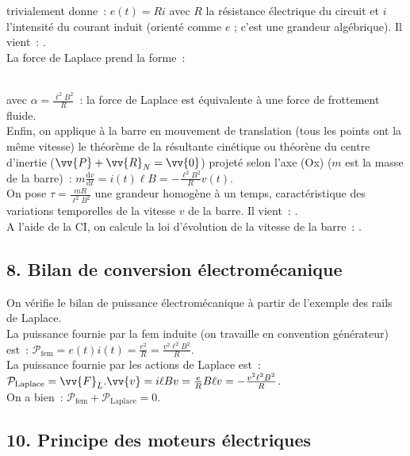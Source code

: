 \documentclass{article}
\newcommand{\mathcolorbox}[2]{\fcolorbox{black}{#1}{$#2$}}
\renewcommand\overrightarrow{\vv}
\begin{document}
\begin{itemize}
trivialement donne : $e(t) = Ri$ avec $R$ la résistance électrique
du circuit et $i$ l'intensité du courant induit (orienté comme $e$ ;
c'est une grandeur algébrique).
Il vient : . \\
La force de Laplace prend la forme : \\
\centerline{\mathcolorbox{gray!20}{\overrightarrow{F} =i\ell B\overrightarrow{u}_{x} =
-\frac{\ell^{2}B^{2}}{R}v\overrightarrow{u}_{x} = -\alpha
\overrightarrow{v}}} \\
avec $\alpha = \frac{\ell^{2}B^{2}}{R}$ : la
force de Laplace est équivalente à une force de frottement fluide.
\\
Enfin, on applique à la barre en mouvement de translation (tous les
points ont la même vitesse) le théorème de la résultante cinétique
ou théorène du centre d'inertie
($\overrightarrow{P}+\overrightarrow{R}_{N} = \overrightarrow{0}$)
projeté selon l'axe (Ox) ($m$ est la masse de la barre) :
$m\frac{\mathrm{d}v}{\mathrm{d}t} = i(t)\ell B = -\frac{\ell^{2}B^{2}}{R}v(t)$. \\
On pose $\tau = \frac{mR}{\ell^{2}B^{2}}$ une grandeur homogène à un
temps, caractéristique des variations temporelles de la vitesse $v$
de la barre. Il vient : .
\\
A l'aide de la CI, on calcule la loi d'évolution de la vitesse de la
barre : .
\end{itemize}

\subsection*{8. Bilan de conversion électromécanique}
On vérifie le bilan de puissance électromécanique à partir de
l'exemple des rails de Laplace. \\
La puissance fournie par la fem induite (on travaille en convention
générateur) est : $\mathcal{P}_{\mathrm{fem}} =
e(t)i(t) = \frac{e^{2}}{R} = \frac{v^{2}\ell^{2}B^{2}}{R}$. \\
La puissance fournie par les actions de Laplace est :
$\mathcal{P}_{\mathrm{Laplace}} = \overrightarrow{F}_{L}.\overrightarrow{v} =
i\ell B v = \frac{e}{R}B\ell v = -\frac{v^{2}\ell^{2} B^{2}}{R}$. \\
On a bien : $\mathcal{P}_{\mathrm{fem}}+\mathcal{P}_{\mathrm{Laplace}} = 0$.

\subsection*{10. Principe des moteurs électriques}
\end{document}
